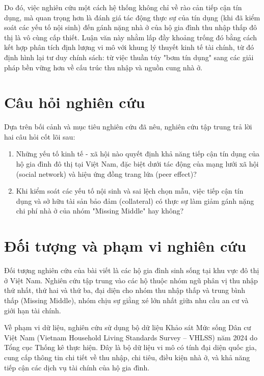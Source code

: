 \documentclass[12pt,a4paper]{report}
\begin{document}
	Do đó, việc nghiên cứu một cách hệ thống không chỉ về rào cản tiếp cận tín dụng, mà quan trọng hơn là đánh giá tác động thực sự của tín dụng (khi đã kiểm soát các yếu tố nội sinh) đến gánh nặng nhà ở của hộ gia đình thu nhập thấp đô thị là vô cùng cấp thiết. Luận văn này nhằm lấp đầy khoảng trống đó bằng cách kết hợp phân tích định lượng vi mô với khung lý thuyết kinh tế tài chính, từ đó định hình lại tư duy chính sách: từ việc thuần túy "bơm tín dụng" sang các giải pháp bền vững hơn về cấu trúc thu nhập và nguồn cung nhà ở.
	
	\section{Câu hỏi nghiên cứu}
	
	Dựa trên bối cảnh và mục tiêu nghiên cứu đã nêu, nghiên cứu tập trung trả lời hai câu hỏi cốt lõi sau:
	
	\begin{enumerate}
		\item Những yếu tố kinh tế - xã hội nào quyết định khả năng tiếp cận tín dụng của hộ gia đình đô thị tại Việt Nam, đặc biệt dưới tác động của mạng lưới xã hội (social network) và hiệu ứng đồng trang lứa (peer effect)?
		\item Khi kiểm soát các yếu tố nội sinh và sai lệch chọn mẫu, việc tiếp cận tín dụng và sở hữu tài sản bảo đảm (collateral) có thực sự làm giảm gánh nặng chi phí nhà ở của nhóm "Missing Middle" hay không?
	\end{enumerate}
	
	\section{Đối tượng và phạm vi nghiên cứu}
	
	Đối tượng nghiên cứu của bài viết là các hộ gia đình sinh sống tại khu vực đô thị ở Việt Nam. Nghiên cứu tập trung vào các hộ thuộc nhóm ngũ phân vị thu nhập thứ nhất, thứ hai và thứ ba, đại diện cho nhóm thu nhập thấp và trung bình thấp (Missing Middle), nhóm chịu sự giằng xé lớn nhất giữa nhu cầu an cư và giới hạn tài chính.
	
	Về phạm vi dữ liệu, nghiên cứu sử dụng bộ dữ liệu Khảo sát Mức sống Dân cư Việt Nam (Vietnam Household Living Standards Survey -- VHLSS) năm 2024 \parencite{VHLSS2024} do Tổng cục Thống kê thực hiện. Đây là bộ dữ liệu vi mô có tính đại diện quốc gia, cung cấp thông tin chi tiết về thu nhập, chi tiêu, điều kiện nhà ở, và khả năng tiếp cận các dịch vụ tài chính của hộ gia đình.
	
\end{document}
